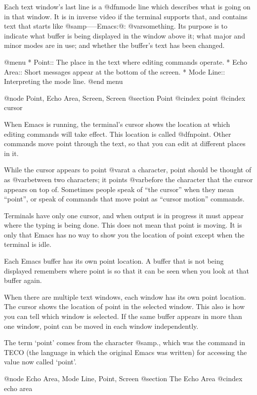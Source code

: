   Each text window's last line is a @dfn{mode line} which describes what is
going on in that window.  It is in inverse video if the terminal supports
that, and contains text that starts like @samp{-----Emacs:@: @var{something}}.  Its
purpose is to indicate what buffer is being displayed in the window above
it; what major and minor modes are in use; and whether the buffer's text
has been changed.

@menu
* Point::	The place in the text where editing commands operate.
* Echo Area::   Short messages appear at the bottom of the screen.
* Mode Line::	Interpreting the mode line.
@end menu

@node Point, Echo Area, Screen, Screen
@section Point
@cindex point
@cindex cursor

  When Emacs is running, the terminal's cursor shows the location at
which editing commands will take effect.  This location is called
@dfn{point}.  Other commands move point through the text, so that you
can edit at different places in it.

  While the cursor appears to point @var{at} a character, point should be
thought of as @var{between} two characters; it points @var{before} the character
that the cursor appears on top of.  Sometimes people speak of ``the
cursor'' when they mean ``point'', or speak of commands that move point as
``cursor motion'' commands.

  Terminals have only one cursor, and when output is in progress it must
appear where the typing is being done.  This does not mean that point is
moving.  It is only that Emacs has no way to show you the location of point
except when the terminal is idle.

  Each Emacs buffer has its own point location.  A buffer that is not being
displayed remembers where point is so that it can be seen when you look at
that buffer again.

  When there are multiple text windows, each window has its own point
location.  The cursor shows the location of point in the selected window.
This also is how you can tell which window is selected.  If the same buffer
appears in more than one window, point can be moved in each window
independently.

  The term `point' comes from the character @samp{.}, which was the
command in TECO (the language in which the original Emacs was written)
for accessing the value now called `point'.

@node Echo Area, Mode Line, Point, Screen
@section The Echo Area
@cindex echo area

